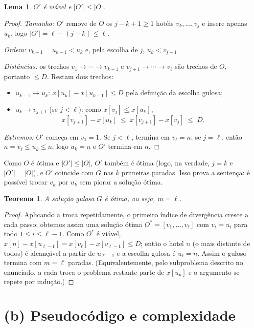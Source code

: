 \documentclass[11pt,a4paper]{article}
\newtheorem{lema}{Lema}
\newtheorem{teorema}{Teorema}
\begin{document}
\begin{lema}
$O'$ é viável e $|O'| \le |O|$.
\end{lema}
\begin{proof}
\emph{Tamanho:} $O'$ remove de $O$ os $j-k+1 \ge 1$ hotéis $v_k,\dots,v_j$ e
insere apenas $u_k$, logo $|O'| = \ell - (j-k) \le \ell$.

\emph{Ordem:} $v_{k-1}=u_{k-1}<u_k$ e, pela escolha de $j$, $u_k < v_{j+1}$.

\emph{Distâncias:} os trechos $v_1\to\cdots\to v_{k-1}$ e
$v_{j+1}\to\cdots\to v_\ell$ são trechos de $O$, portanto $\le D$. Restam dois trechos:
\begin{itemize}
  \item $u_{k-1}\to u_k$: $x[u_k]-x[u_{k-1}] \le D$ pela definição da escolha gulosa;
  \item $u_k \to v_{j+1}$ (se $j<\ell$): como $x[v_j] \le x[u_k]$,
        \[ x[v_{j+1}] - x[u_k] \;\le\; x[v_{j+1}] - x[v_j] \;\le\; D. \]
\end{itemize}
\emph{Extremos:} $O'$ começa em $v_1=1$. Se $j<\ell$, termina em $v_\ell=n$;
se $j=\ell$, então $n = v_\ell \le u_k \le n$, logo $u_k=n$ e $O'$ termina em $n$.
\end{proof}

Como $O$ é ótima e $|O'|\le|O|$, $O'$ também é ótima (logo, na verdade, $j=k$ e
$|O'|=|O|$), e $O'$ coincide com $G$ nas $k$ primeiras paradas. Isso prova a
sentença: é possível trocar $v_k$ por $u_k$ sem piorar a solução ótima.

\begin{teorema}
A solução gulosa $G$ é ótima, ou seja, $m = \ell$.
\end{teorema}
\begin{proof}
Aplicando a troca repetidamente, o primeiro índice de divergência cresce a cada
passo; obtemos assim uma solução ótima $O^*=[v_1,\dots,v_\ell]$ com $v_i=u_i$
para todo $1\le i\le \ell-1$. Como $O^*$ é viável, $x[n]-x[u_{\ell-1}] =
x[v_\ell]-x[v_{\ell-1}] \le D$; então o hotel $n$ (o mais distante de todos) é
alcançável a partir de $u_{\ell-1}$ e a escolha gulosa é $u_\ell = n$. Assim o
guloso termina com $m=\ell$ paradas. (Equivalentemente, pelo subproblema descrito no
enunciado, a cada troca o problema restante parte de $x[u_k]$ e o argumento se
repete por indução.)
\end{proof}

\section*{(b) Pseudocódigo e complexidade}
\end{document}
